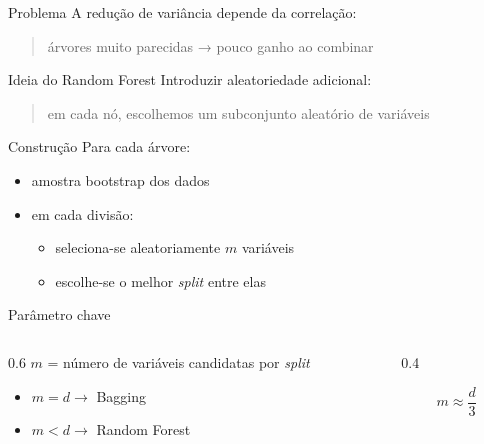 \documentclass[
  ignorenonframetext,
  aspectratio=169,
]{beamer}
\providecommand{\tightlist}{%
  \setlength{\itemsep}{0pt}\setlength{\parskip}{0pt}}
\begin{document}
\begin{frame}
\begin{block}{Problema}
\label{problema}
A redução de variância depende da correlação:

\begin{quote}
árvores muito parecidas → pouco ganho ao combinar
\end{quote}
\end{block}

\begin{block}{Ideia do Random Forest}
\label{ideia-do-random-forest}
Introduzir aleatoriedade adicional:

\begin{quote}
em cada nó, escolhemos um subconjunto aleatório de variáveis
\end{quote}
\end{block}
\end{frame}

\begin{frame}
\begin{block}{Construção}
\label{construuxe7uxe3o}
Para cada árvore:

\begin{itemize}
\tightlist
\item
  amostra bootstrap dos dados
\item
  em cada divisão:

  \begin{itemize}
  \tightlist
  \item
    seleciona-se aleatoriamente \(m\) variáveis
  \item
    escolhe-se o melhor \emph{split} entre elas
  \end{itemize}
\end{itemize}
\end{block}

\begin{block}{Parâmetro chave}
\label{paruxe2metro-chave}
\begin{columns}[T]
\begin{column}{0.6\linewidth}
\(m\) = número de variáveis candidatas por \emph{split}

\begin{itemize}
\tightlist
\item
  \(m = d \rightarrow\) Bagging
\item
  \(m < d \rightarrow\) Random Forest
\end{itemize}
\end{column}

\begin{column}{0.4\linewidth}
\vspace{2.5cm}

\[
m \approx \frac{d}{3}
\]
\end{column}
\end{columns}
\end{block}
\end{frame}
\end{document}
